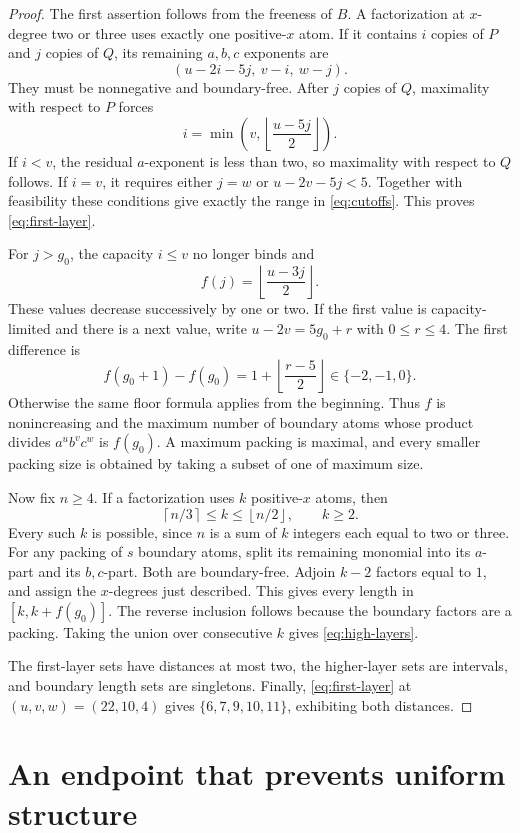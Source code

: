 \documentclass[11pt]{article}
\theoremstyle{definition}
\begin{document}
\begin{proof}
The first assertion follows from the freeness of $B$. A factorization at $x$-degree two or three uses exactly one positive-$x$ atom. If it contains $i$ copies of $P$ and $j$ copies of $Q$, its remaining $a,b,c$ exponents are
\[
 (u-2i-5j,\ v-i,\ w-j).
\]
They must be nonnegative and boundary-free. After $j$ copies of $Q$, maximality with respect to $P$ forces
\[
 i=\min\left(v,\left\lfloor\frac{u-5j}{2}\right\rfloor\right).
\]
If $i<v$, the residual $a$-exponent is less than two, so maximality with respect to $Q$ follows. If $i=v$, it requires either $j=w$ or $u-2v-5j<5$. Together with feasibility these conditions give exactly the range in \eqref{eq:cutoffs}. This proves \eqref{eq:first-layer}.

For $j>g_0$, the capacity $i\leq v$ no longer binds and
\[
 f(j)=\left\lfloor\frac{u-3j}{2}\right\rfloor.
\]
These values decrease successively by one or two. If the first value is capacity-limited and there is a next value, write $u-2v=5g_0+r$ with $0\leq r\leq4$. The first difference is
\[
 f(g_0+1)-f(g_0)=1+\left\lfloor\frac{r-5}{2}\right\rfloor\in\{-2,-1,0\}.
\]
Otherwise the same floor formula applies from the beginning. Thus $f$ is nonincreasing and the maximum number of boundary atoms whose product divides $a^ub^vc^w$ is $f(g_0)$. A maximum packing is maximal, and every smaller packing size is obtained by taking a subset of one of maximum size.

Now fix $n\geq4$. If a factorization uses $k$ positive-$x$ atoms, then
\[
 \left\lceil n/3\right\rceil\leq k\leq\left\lfloor n/2\right\rfloor,
 \qquad k\geq2.
\]
Every such $k$ is possible, since $n$ is a sum of $k$ integers each equal to two or three. For any packing of $s$ boundary atoms, split its remaining monomial into its $a$-part and its $b,c$-part. Both are boundary-free. Adjoin $k-2$ factors equal to $1$, and assign the $x$-degrees just described. This gives every length in $[k,k+f(g_0)]$. The reverse inclusion follows because the boundary factors are a packing. Taking the union over consecutive $k$ gives \eqref{eq:high-layers}.

The first-layer sets have distances at most two, the higher-layer sets are intervals, and boundary length sets are singletons. Finally, \eqref{eq:first-layer} at $(u,v,w)=(22,10,4)$ gives $\{6,7,9,10,11\}$, exhibiting both distances.
\end{proof}

\section{An endpoint that prevents uniform structure}
\end{document}
